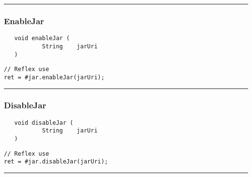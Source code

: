 \rule{15cm}{2pt}
\subsubsection{EnableJar}
\label{Api:EnableJar}
\begin{verbatim}
   void enableJar (
           String    jarUri
   )
\end{verbatim}
\begin{lstlisting}[language=reflex]
// Reflex use
ret = #jar.enableJar(jarUri);
\end{lstlisting}



\rule{15cm}{2pt}
\subsubsection{DisableJar}
\label{Api:DisableJar}
\begin{verbatim}
   void disableJar (
           String    jarUri
   )
\end{verbatim}
\begin{lstlisting}[language=reflex]
// Reflex use
ret = #jar.disableJar(jarUri);
\end{lstlisting}



\rule{15cm}{2pt}

